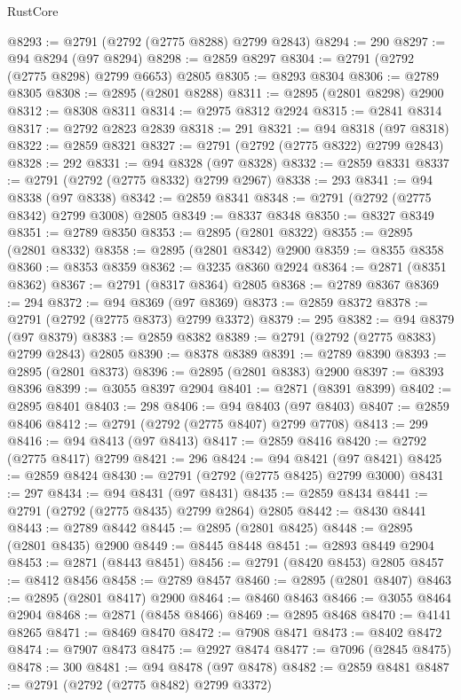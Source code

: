 \begin{lexlean}{RustCore}
\begin{coremodule}
@8293 := @2791 (@2792 (@2775 @8288) @2799 @2843)
@8294 := 290
@8297 := @94 @8294 (@97 @8294)
@8298 := @2859 @8297
@8304 := @2791 (@2792 (@2775 @8298) @2799 @6653) @2805
@8305 := @8293 @8304
@8306 := @2789 @8305
@8308 := @2895 (@2801 @8288)
@8311 := @2895 (@2801 @8298) @2900
@8312 := @8308 @8311
@8314 := @2975 @8312 @2924
@8315 := @2841 @8314
@8317 := @2792 @2823 @2839
@8318 := 291
@8321 := @94 @8318 (@97 @8318)
@8322 := @2859 @8321
@8327 := @2791 (@2792 (@2775 @8322) @2799 @2843)
@8328 := 292
@8331 := @94 @8328 (@97 @8328)
@8332 := @2859 @8331
@8337 := @2791 (@2792 (@2775 @8332) @2799 @2967)
@8338 := 293
@8341 := @94 @8338 (@97 @8338)
@8342 := @2859 @8341
@8348 := @2791 (@2792 (@2775 @8342) @2799 @3008) @2805
@8349 := @8337 @8348
@8350 := @8327 @8349
@8351 := @2789 @8350
@8353 := @2895 (@2801 @8322)
@8355 := @2895 (@2801 @8332)
@8358 := @2895 (@2801 @8342) @2900
@8359 := @8355 @8358
@8360 := @8353 @8359
@8362 := @3235 @8360 @2924
@8364 := @2871 (@8351 @8362)
@8367 := @2791 (@8317 @8364) @2805
@8368 := @2789 @8367
@8369 := 294
@8372 := @94 @8369 (@97 @8369)
@8373 := @2859 @8372
@8378 := @2791 (@2792 (@2775 @8373) @2799 @3372)
@8379 := 295
@8382 := @94 @8379 (@97 @8379)
@8383 := @2859 @8382
@8389 := @2791 (@2792 (@2775 @8383) @2799 @2843) @2805
@8390 := @8378 @8389
@8391 := @2789 @8390
@8393 := @2895 (@2801 @8373)
@8396 := @2895 (@2801 @8383) @2900
@8397 := @8393 @8396
@8399 := @3055 @8397 @2904
@8401 := @2871 (@8391 @8399)
@8402 := @2895 @8401
@8403 := 298
@8406 := @94 @8403 (@97 @8403)
@8407 := @2859 @8406
@8412 := @2791 (@2792 (@2775 @8407) @2799 @7708)
@8413 := 299
@8416 := @94 @8413 (@97 @8413)
@8417 := @2859 @8416
@8420 := @2792 (@2775 @8417) @2799
@8421 := 296
@8424 := @94 @8421 (@97 @8421)
@8425 := @2859 @8424
@8430 := @2791 (@2792 (@2775 @8425) @2799 @3000)
@8431 := 297
@8434 := @94 @8431 (@97 @8431)
@8435 := @2859 @8434
@8441 := @2791 (@2792 (@2775 @8435) @2799 @2864) @2805
@8442 := @8430 @8441
@8443 := @2789 @8442
@8445 := @2895 (@2801 @8425)
@8448 := @2895 (@2801 @8435) @2900
@8449 := @8445 @8448
@8451 := @2893 @8449 @2904
@8453 := @2871 (@8443 @8451)
@8456 := @2791 (@8420 @8453) @2805
@8457 := @8412 @8456
@8458 := @2789 @8457
@8460 := @2895 (@2801 @8407)
@8463 := @2895 (@2801 @8417) @2900
@8464 := @8460 @8463
@8466 := @3055 @8464 @2904
@8468 := @2871 (@8458 @8466)
@8469 := @2895 @8468
@8470 := @4141 @8265
@8471 := @8469 @8470
@8472 := @7908 @8471
@8473 := @8402 @8472
@8474 := @7907 @8473
@8475 := @2927 @8474
@8477 := @7096 (@2845 @8475)
@8478 := 300
@8481 := @94 @8478 (@97 @8478)
@8482 := @2859 @8481
@8487 := @2791 (@2792 (@2775 @8482) @2799 @3372)

\end{coremodule}
\end{lexlean}

